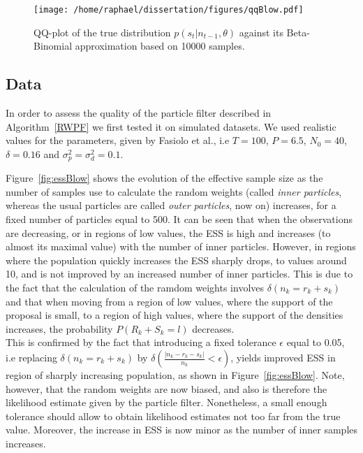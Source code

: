 \documentclass[12pt]{article}
\begin{document}
	\begin{figure}[htb]
		\centering
		\begin{minipage}{0.6\textwidth}
			\centering
			\texttt{[image: /home/raphael/dissertation/figures/qqBlow.pdf]}
		\end{minipage}
		\caption[QQ-plot of the true distribution $p(s_t | n_{t-1}, \theta)$ against its Beta-Binomial approximation.]{QQ-plot of the true distribution $p(s_t | n_{t-1}, \theta)$ against its Beta-Binomial approximation based on 10000 samples.}
		\label{fig:qqBlow}
	\end{figure}
	
\clearpage
	\subsection{Data}
	In order to assess the quality of the particle filter described in Algorithm~\ref{RWPF} we first tested it on simulated datasets. We used realistic values for the parameters, given by Fasiolo et al.\cite{fasiolo2014statistical}, i.e $T=100$, $P=6.5$, $N_0=40$, $\delta=0.16$ and $\sigma_p^2=\sigma_d^2=0.1$.
	
	Figure~\ref{fig:essBlow} shows the evolution of the effective sample size as the number of samples use to calculate the random weights (called \emph{inner particles}, whereas the usual particles are called \emph{outer particles}, now on) increases, for a fixed number of particles equal to 500. It can be seen that when the observations are decreasing, or in regions of low values, the ESS is high and increases (to almost its maximal value) with the number of inner particles. However, in regions where the population quickly increases the ESS sharply drops, to values around 10, and is not improved by an increased number of inner particles. This is due to the fact that the calculation of the ramdom weights involves $\delta(n_k = r_k+s_k)$ and that when moving from a region of low values, where the support of the proposal is small, to a region of high values, where the support of the densities increases, the probability $P(R_k+S_k=l)$ decreases. \\
	This is confirmed by the fact that introducing a fixed tolerance $\epsilon$  equal to 0.05, i.e replacing $\delta(n_k = r_k+s_k)$ by $\delta(\frac{|n_k - r_k-s_k|}{n_k} < \epsilon)$, yields improved ESS in region of sharply increasing population, as shown in Figure~\ref{fig:essBlow}. Note, however, that the random weights are now biased, and also is therefore the likelihood estimate given by the particle filter. Nonetheless, a small enough tolerance should allow to obtain likelihood estimates not too far from the true value. Moreover, the increase in ESS is now minor as the number of inner samples increases.
	
\end{document}
